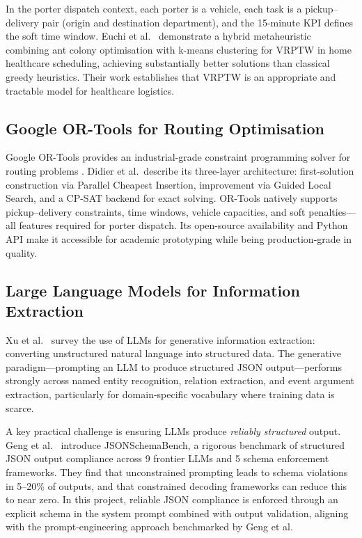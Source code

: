 \documentclass[12pt,a4paper]{article}
\begin{document}
In the porter dispatch context, each porter is a vehicle, each task is a pickup--delivery pair (origin and destination department), and the 15-minute KPI defines the soft time window. Euchi et al.\ \cite{euchi2020} demonstrate a hybrid metaheuristic combining ant colony optimisation with k-means clustering for VRPTW in home healthcare scheduling, achieving substantially better solutions than classical greedy heuristics. Their work establishes that VRPTW is an appropriate and tractable model for healthcare logistics.

\subsection{Google OR-Tools for Routing Optimisation}

Google OR-Tools provides an industrial-grade constraint programming solver for routing problems \cite{didier2023}. Didier et al.\ describe its three-layer architecture: first-solution construction via Parallel Cheapest Insertion, improvement via Guided Local Search, and a CP-SAT backend for exact solving. OR-Tools natively supports pickup--delivery constraints, time windows, vehicle capacities, and soft penalties---all features required for porter dispatch. Its open-source availability and Python API make it accessible for academic prototyping while being production-grade in quality.

\subsection{Large Language Models for Information Extraction}

Xu et al.\ \cite{xu2024} survey the use of LLMs for generative information extraction: converting unstructured natural language into structured data. The generative paradigm---prompting an LLM to produce structured JSON output---performs strongly across named entity recognition, relation extraction, and event argument extraction, particularly for domain-specific vocabulary where training data is scarce.

A key practical challenge is ensuring LLMs produce \textit{reliably structured} output. Geng et al.\ \cite{geng2025} introduce JSONSchemaBench, a rigorous benchmark of structured JSON output compliance across 9 frontier LLMs and 5 schema enforcement frameworks. They find that unconstrained prompting leads to schema violations in 5--20\% of outputs, and that constrained decoding frameworks can reduce this to near zero. In this project, reliable JSON compliance is enforced through an explicit schema in the system prompt combined with output validation, aligning with the prompt-engineering approach benchmarked by Geng et al.
\end{document}
